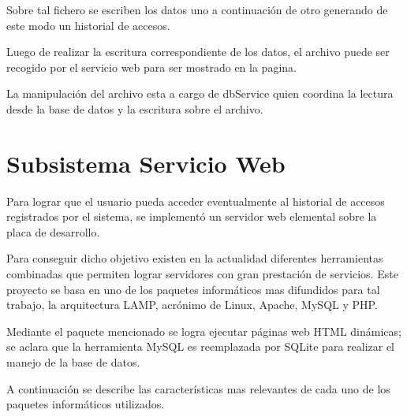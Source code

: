 Sobre tal fichero se escriben los datos uno a continuación de otro generando de este modo un historial de accesos.

Luego de realizar la escritura correspondiente de los datos, el archivo puede ser recogido por el servicio web para ser mostrado en la pagina.

La manipulación del archivo esta a cargo de dbService quien coordina la lectura desde la base de datos y la escritura sobre el archivo.

\section{Subsistema Servicio Web}

Para lograr que el usuario pueda acceder eventualmente al historial de accesos registrados por el sistema, se implementó un servidor web elemental sobre la placa de desarrollo.

Para conseguir dicho objetivo existen en la actualidad diferentes herramientas combinadas que permiten lograr servidores con gran prestación de servicios. Este proyecto se basa en uno de los paquetes informáticos mas difundidos para tal trabajo, la arquitectura LAMP, acrónimo de Linux, Apache, MySQL y PHP.

Mediante el paquete mencionado se logra ejecutar páginas web HTML dinámicas; se aclara que la herramienta MySQL es reemplazada por SQLite para realizar el manejo de la base de datos.

A continuación se describe las características mas relevantes de cada uno de los paquetes informáticos utilizados.

